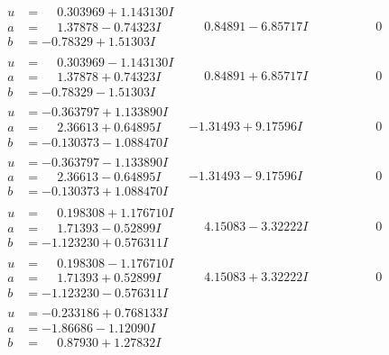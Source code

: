 \documentclass[1p]{elsarticle_modified}
\theoremstyle{definition}
\begin{document}
$$\begin{array}{c|c|c}
\begin{aligned}
u &= \phantom{-}0.303969 + 1.143130 I \\
a &= \phantom{-}1.37878 - 0.74323 I \\
b &= -0.78329 + 1.51303 I\end{aligned}
 & \phantom{-}0.84891 - 6.85717 I & \phantom{-0.000000 } 0 \\ \hline\begin{aligned}
u &= \phantom{-}0.303969 - 1.143130 I \\
a &= \phantom{-}1.37878 + 0.74323 I \\
b &= -0.78329 - 1.51303 I\end{aligned}
 & \phantom{-}0.84891 + 6.85717 I & \phantom{-0.000000 } 0 \\ \hline\begin{aligned}
u &= -0.363797 + 1.133890 I \\
a &= \phantom{-}2.36613 + 0.64895 I \\
b &= -0.130373 - 1.088470 I\end{aligned}
 & -1.31493 + 9.17596 I & \phantom{-0.000000 } 0 \\ \hline\begin{aligned}
u &= -0.363797 - 1.133890 I \\
a &= \phantom{-}2.36613 - 0.64895 I \\
b &= -0.130373 + 1.088470 I\end{aligned}
 & -1.31493 - 9.17596 I & \phantom{-0.000000 } 0 \\ \hline\begin{aligned}
u &= \phantom{-}0.198308 + 1.176710 I \\
a &= \phantom{-}1.71393 - 0.52899 I \\
b &= -1.123230 + 0.576311 I\end{aligned}
 & \phantom{-}4.15083 - 3.32222 I & \phantom{-0.000000 } 0 \\ \hline\begin{aligned}
u &= \phantom{-}0.198308 - 1.176710 I \\
a &= \phantom{-}1.71393 + 0.52899 I \\
b &= -1.123230 - 0.576311 I\end{aligned}
 & \phantom{-}4.15083 + 3.32222 I & \phantom{-0.000000 } 0 \\ \hline\begin{aligned}
u &= -0.233186 + 0.768133 I \\
a &= -1.86686 - 1.12090 I \\
b &= \phantom{-}0.87930 + 1.27832 I\end{aligned}

\end{array}$$
\end{document}
